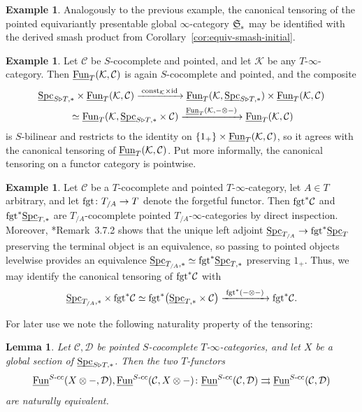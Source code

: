 \documentclass[reqno]{memo-l}
\theoremstyle{mythm}
\newtheorem{lemma}[thm]{Lemma}
\theoremstyle{definition}
\newtheorem{ex}[thm]{Example}
\numberwithin{equation}{section}
\newcommand{\Cc}{{\mathcal{C}}}
\newcommand{\Dd}{{\mathcal{D}}}
\newcommand{\Kk}{{\mathcal{K}}}
\DeclareMathOperator{\Spc}{Spc}
\newcommand{\Fun}{{\textup{Fun}}}
\newcommand{\const}{\textup{const}}
\newcommand{\id}{\textup{id}}
\newcommand{\fgt}{\textup{fgt}}
\newcommand{\ulhelper}[2]{\underline{\setbox0=\hbox{$#1#2$}\dp0=0.4pt \box0\relax}}
\newcommand{\ul}[1]{{\mathpalette\ulhelper{#1}}\hbox{\rule[-2pt]{0pt}{0pt}}}
\newcommand{\myS}{{{\mathfrak S\kern-.4pt}}}
\begin{document}
\begin{ex}
    Analogously to the previous example, the canonical tensoring of the pointed equivariantly presentable global $\infty$-category $\ul\myS_*$ may be identified with the derived smash product from Corollary~\ref{cor:equiv-smash-initial}.
\end{ex}

\begin{ex}\label{ex:tensoring-pointwise}
    Let $\Cc$ be $S$-cocomplete and pointed, and let $\Kk$ be any $T$-$\infty$-category. Then $\ul\Fun_T(\Kk,\Cc)$ is again $S$-cocomplete and pointed, and the composite
    \begin{multline*}
        \ul\Spc_{S\triangleright T,*}\times\ul\Fun_T(\Kk,\Cc)\xrightarrow{\;\const_{\Kk}\times\id\;}
        \ul\Fun_T(\Kk,\ul\Spc_{S\triangleright T,*})\times\ul\Fun_T(\Kk,\Cc)\\
        {}\simeq\ul\Fun_T(\Kk,\ul\Spc_{S\triangleright T,*}\times\Cc)\xrightarrow{\;\ul\Fun_T(\Kk,{-}\otimes{-})\;}\ul\Fun_T(\Kk,\Cc)
    \end{multline*}     
    is $S$-bilinear and restricts to the identity on $\{1_+\}\times\ul\Fun_T(\Kk,\Cc)$, so it agrees with the canonical tensoring of $\ul\Fun_T(\Kk,\Cc)$. Put more informally, the canonical tensoring on a functor category is pointwise.
\end{ex}

\begin{ex}\label{ex:tensoring-slice}
    Let $\Cc$ be a $T$-cocomplete and pointed $T$-$\infty$-category, let $A\in T$ arbitrary, and let $\fgt\colon T_{/A}\to T$ denote the forgetful functor. Then $\fgt^*\Cc$ and $\fgt^*\ul\Spc_{T,*}$ are $T_{/A}$-cocomplete pointed $T_{/A}$-$\infty$-categories by direct inspection. Moreover, \cite{martini2021yoneda}*{Remark~3.7.2} shows that the unique left adjoint $\ul\Spc_{T_{/A}}\to\fgt^*\ul\Spc_T$ preserving the terminal object is an equivalence, so passing to pointed objects levelwise provides an equivalence $\ul\Spc_{T_{/A},*}\simeq\fgt^*\ul\Spc_{T,*}$ preserving $1_+$. Thus, we may identify the canonical tensoring of $\fgt^*\Cc$ with
    \[
        \ul\Spc_{T_{/A},*}\times\fgt^*\Cc\simeq\fgt^*\big(\ul\Spc_{T,*}\times\Cc\big)\xrightarrow{\;\fgt^*({-}\otimes{-})\;}\fgt^*\Cc.
    \]
\end{ex}

For later use we note the following naturality property of the tensoring:

\begin{lemma}\label{lemma:tensoring-natural}
    Let $\Cc,\Dd$ be pointed $S$-cocomplete $T$-$\infty$-categories, and let $X$ be a global section of $\ul\Spc_{S\triangleright T,*}$. Then the two $T$-functors
    \[
        \ul\Fun^\textup{$S$-cc}(X\otimes{-},\Dd),
        \ul\Fun^\textup{$S$-cc}(\Cc,X\otimes{-})\colon\ul\Fun^\textup{$S$-cc}(\Cc,\Dd)\rightrightarrows\ul\Fun^\textup{$S$-cc}(\Cc,\Dd)
    \]
    are naturally equivalent.
\end{lemma}
\end{document}
